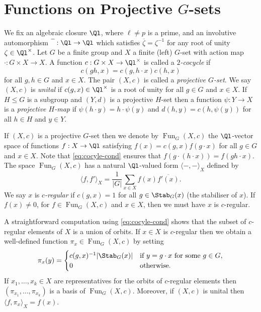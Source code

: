 \documentclass[eqthmnum,nocolour,skinny]{jt-calcs}
\DeclareMathOperator{\Fun}{Fun}
\begin{document}
\section{\texorpdfstring{Functions on Projective $G$-sets}{Functions on Projective G-sets}}\label{sec:proj-G-sets}
\begin{pa}\label{pa:G-set-funcs}
We fix an algebraic closure $\Ql$, where $\ell \neq p$ is a prime, and an involutive automorphism $\overline{\phantom{\zeta}} : \Ql \to \Ql$ which satisfies $\overline{\zeta} = \zeta^{-1}$ for any root of unity $\zeta \in \Ql^{\times}$. Let $G$ be a finite group and $X$ a finite (left) $G$-set with action map $\cdot : G \times X \to X$. A function $c : G \times X \to \Ql^{\times}$ is called a \emph{$2$-cocycle} if
\begin{equation}\label{eq:cocyle-cond}
c(gh,x) = c(g,h\cdot x)c(h,x)
\end{equation}
for all $g,h \in G$ and $x \in X$. The pair $(X,c)$ is called a \emph{projective $G$-set}. We say $(X,c)$ is \emph{unital} if $c(g,x) \in \Ql^{\times}$ is a root of unity for all $g \in G$ and $x \in X$. If $H \leqslant G$ is a subgroup and $(Y,d)$ is a projective $H$-set then a function $\psi : Y \to X$ is a \emph{projective $H$-map} if $\psi(h\cdot y) = h\cdot\psi(y)$ and $d(h,y) = c(h,\psi(y))$ for all $h \in H$ and $y \in Y$.
\end{pa}

\begin{pa}\label{pa:G-space-funcs}
If $(X,c)$ is a projective $G$-set then we denote by $\Fun_G(X,c)$ the $\Ql$-vector space of functions $f : X \to \Ql$ satisfying $f(x) = c(g,x)f(g\cdot x)$ for all $g \in G$ and $x \in X$. Note that \cref{eq:cocyle-cond} ensures that $f(g\cdot (h\cdot x)) = f(gh\cdot x)$. The space $\Fun_G(X,c)$ has a natural $\Ql$-valued form $\langle -,-\rangle_X$ defined by
\begin{equation*}
\langle f,f'\rangle_X = \frac{1}{|G|}\sum_{x \in X} f(x)\overline{f'(x)}.
\end{equation*}
We say $x$ is \emph{$c$-regular} if $c(g,x) = 1$ for all $g \in \Stab_G(x)$ (the stabiliser of $x$). If $f(x) \neq 0$, for $f \in \Fun_G(X,c)$ and $x \in X$, then we must have $x$ is $c$-regular.
\end{pa}

\begin{pa}\label{pa:orb-funcs}
A straightforward computation using \cref{eq:cocyle-cond} shows that the subset of $c$-regular elements of $X$ is a union of orbits. If $x \in X$ is $c$-regular then we obtain a well-defined function $\pi_x \in \Fun_G(X,c)$ by setting
\begin{equation*}
\pi_x(y) = \begin{cases}
c(g,x)^{-1}|\Stab_G(x)| &\text{if }y = g\cdot x\text{ for some }g \in G,\\
0 &\text{otherwise}.
\end{cases}
\end{equation*}
If $x_1,\dots,x_k \in X$ are representatives for the orbits of $c$-regular elements then $(\pi_{x_1},\dots,\pi_{x_k})$ is a basis of $\Fun_G(X,c)$. Moreover, if $(X,c)$ is unital then $\langle f,\pi_x\rangle_X = f(x)$.
\end{pa}
\end{document}
